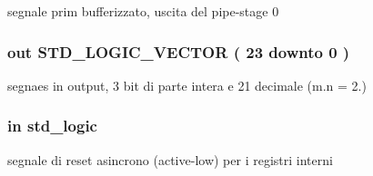 segnale prim bufferizzato, uscita del pipe-\/stage 0 

\subsubsection[{\texorpdfstring{q}{q}}]{ {\bfseries \textcolor{vhdlchar}{out}\textcolor{vhdlchar}{ }} {\bfseries \textcolor{vhdlchar}{S\+T\+D\+\_\+\+L\+O\+G\+I\+C\+\_\+\+V\+E\+C\+T\+OR}\textcolor{vhdlchar}{ }\textcolor{vhdlchar}{(}\textcolor{vhdlchar}{ }\textcolor{vhdlchar}{ } \textcolor{vhdldigit}{23} \textcolor{vhdlchar}{ }\textcolor{vhdlchar}{downto}\textcolor{vhdlchar}{ }\textcolor{vhdlchar}{ } \textcolor{vhdldigit}{0} \textcolor{vhdlchar}{ }\textcolor{vhdlchar}{)}\textcolor{vhdlchar}{ }} \hspace{0.3cm}{\ttfamily [Port]}}\hypertarget{group___linear_regression_gacec4f4b6d139d1ada088ca2d3d881418}{}\label{group___linear_regression_gacec4f4b6d139d1ada088ca2d3d881418}


segnaes in output, 3 bit di parte intera e 21 decimale (m.\+n = 2.) 

\subsubsection[{\texorpdfstring{reset\+\_\+n}{reset_n}}]{ {\bfseries \textcolor{vhdlchar}{in}\textcolor{vhdlchar}{ }} {\bfseries \textcolor{vhdlchar}{std\+\_\+logic}\textcolor{vhdlchar}{ }} \hspace{0.3cm}{\ttfamily [Port]}}\hypertarget{group___linear_regression_ga446ea52ed8c4a84181a47d9165ce41a5}{}\label{group___linear_regression_ga446ea52ed8c4a84181a47d9165ce41a5}


segnale di reset asincrono (active-\/low) per i registri interni 

